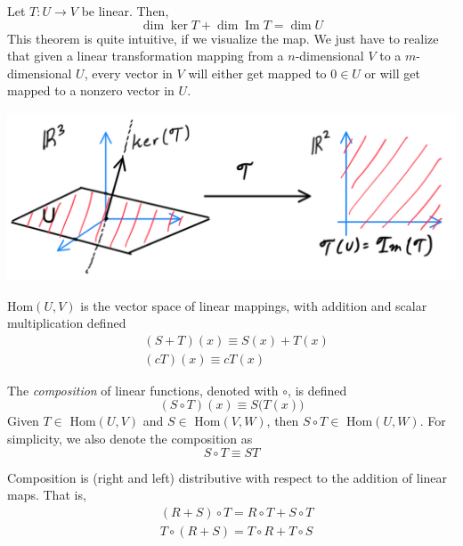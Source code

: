 \documentclass{article}
\DeclareMathOperator{\im}{Im}
\begin{document}
  \begin{theorem}
    Let $T: U \longrightarrow V$ be linear. Then, 
    \begin{equation}
      \dim \ker T + \dim \im T = \dim U
    \end{equation}
    This theorem is quite intuitive, if we visualize the map. We just have to realize that given a linear transformation mapping from a $n$-dimensional $V$ to a $m$-dimensional $U$, every vector in $V$ will either get mapped to $0 \in U$ or will get mapped to a nonzero vector in $U$. 
    \begin{center}
      \includegraphics[scale=0.4]{img/Rank_Nullity.PNG}
    \end{center}
  \end{theorem}

  \begin{proposition}
    Hom$(U, V)$ is the vector space of linear mappings, with addition and scalar multiplication defined
    \begin{align*}
      & (S + T) (x) \equiv S(x) + T(x) \\
      & (c T) (x) \equiv c T(x)
    \end{align*}
  \end{proposition}

  \begin{definition}
    The \textit{composition} of linear functions, denoted with $\circ$, is defined
    \begin{equation}
      (S \circ T) (x) \equiv S\big( T(x)\big)
    \end{equation}
    Given $T \in $ Hom$(U, V)$ and $S \in $ Hom$(V, W)$, then $S \circ T \in $ Hom$(U, W)$. For simplicity, we also denote the composition as 
    \begin{equation}
      S \circ T \equiv S T
    \end{equation}
  \end{definition}

  \begin{proposition}
    Composition is (right and left) distributive with respect to the addition of linear maps. That is, 
    \begin{align*}
      & (R + S) \circ T = R \circ T + S \circ T \\
      & T \circ (R + S) = T \circ R + T \circ S 
    \end{align*}
  \end{proposition}
\end{document}
